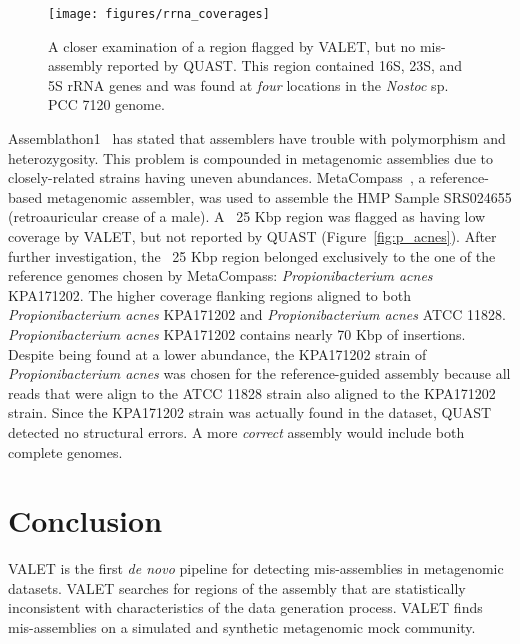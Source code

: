\documentclass[12pt,\mydriver]{thesis}
\begin{document}
\begin{figure}[tb!]
\begin{center}
\texttt{[image: figures/rrna\_coverages]}
\end{center}
\renewcommand{\baselinestretch}{1}
\small\normalsize
\begin{quote}
\caption[Ribosomal genes found in region marked by VALET]{A closer examination of a region flagged by VALET, but no mis-assembly reported by QUAST. This region contained 16S, 23S, and 5S rRNA genes and was found at \emph{four} locations in the \emph{Nostoc} sp. PCC 7120 genome.}
\label{fig:rrna_misassembly}
\end{quote}
\end{figure}
\renewcommand{\baselinestretch}{2}
\small\normalsize

Assemblathon1~\cite{earl2011assemblathon} has stated that assemblers have trouble with polymorphism and heterozygosity.
This problem is compounded in metagenomic assemblies due to closely-related strains having uneven abundances.
MetaCompass~\cite{metacompass}, a reference-based metagenomic assembler, was used to assemble the HMP Sample SRS024655 (retroauricular crease of a male).
A ~25 Kbp region was flagged as having low coverage by VALET, but not reported by QUAST (Figure~\ref{fig:p_acnes}).
After further investigation, the ~25 Kbp region belonged exclusively to the one of the reference genomes chosen by MetaCompass: \emph{Propionibacterium acnes} KPA171202.
The higher coverage flanking regions aligned to both \emph{Propionibacterium acnes} KPA171202 and \emph{Propionibacterium acnes} ATCC 11828.
\emph{Propionibacterium acnes} KPA171202 contains nearly 70 Kbp of insertions.
Despite being found at a lower abundance, the KPA171202 strain of \emph{Propionibacterium acnes} was chosen for the reference-guided assembly because all reads that were align to the ATCC 11828 strain also aligned to the KPA171202 strain.
Since the KPA171202 strain was actually found in the dataset, QUAST detected no structural errors.
A more \emph{correct} assembly would include both complete genomes.


\section{Conclusion}

VALET is the first \emph{de novo} pipeline for detecting mis-assemblies in metagenomic datasets.
VALET searches for regions of the assembly that are statistically inconsistent with characteristics of the data generation process.
VALET finds mis-assemblies on a simulated and synthetic metagenomic mock community.
\end{document}
